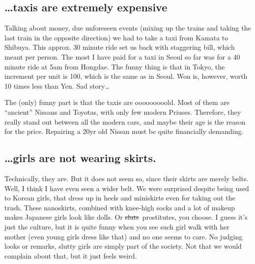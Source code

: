 \begin{post}
\begin{content}
\subsection{{\ldots}taxis are extremely expensive}
\begin{figure}
\vspace{-12pt}
\vspace{-24pt}
\end{figure}Talking about money, due unforeseen events (mixing up the trains and taking the last train in the opposite direction) we had to take a taxi from Kamata to Shibuya. This approx. 30 minute ride set us back with staggering  bill, which meant  per person. The most I have paid for a taxi in Seoul so far was  for a 40 minute ride at 5am from Hongdae. The funny thing is that in Tokyo, the increment per unit is 100, which is the same as in Seoul. Won is, however, worth 10 times less than Yen. Sad story\ldots

The (only) funny part is that the taxis are ooooooooold. Most of them are ``ancient'' Nissans and Toyotas, with only few modern Priuses. Therefore, they really stand out between all the modern cars, and maybe their age is the reason for the price. Repairing a 20yr old Nissan must be quite financially demanding.

\subsection{{\ldots}girls are not wearing skirts.}
Technically, they are. But it does not seem so, since their skirts are merely belts. Well, I think I have even seen a wider belt. We were surprised despite being used to Korean girls, that dress up in heels and miniskirts even for taking out the trash. These nanoskirts, combined with knee-high socks and a lot of makeup makes Japanese girls look like dolls. Or \sout{sluts} prostitutes, you choose. I guess it's just the culture, but it is quite funny when you see such girl walk with her mother (even young girls dress like that) and no one seems to care. No judging looks or remarks, slutty girls are simply part of the society. Not that we would complain about that, but it just feels weird.


\end{content}
\end{post}
